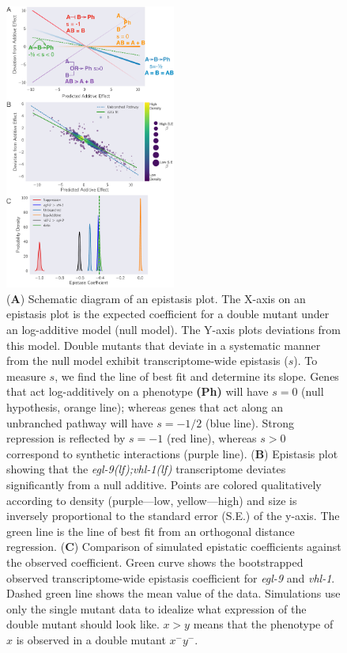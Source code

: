\documentclass[9pt,twocolumn,twoside]{pnas-new}
\newcommand{\gene}[1]{\mbox{\emph{#1}}}
\newcommand{\eglvhl}{\gene{egl-9(lf);vhl-1(lf)}}
\begin{document}
\begin{figure}[tbhp]
  \centering
  \includegraphics[width=0.5\textwidth]{../figs/egl9vhl1-epistasis.pdf}
  \caption{
    (\textbf{A}) Schematic diagram of an epistasis plot. The X-axis on an
    epistasis plot is the expected coefficient for a double mutant under an
    log-additive model (null model). The Y-axis plots deviations from this
    model. Double mutants that deviate in a systematic manner from the null
    model exhibit transcriptome-wide epistasis ($s$). To measure $s$, we find
    the line of best fit and determine its slope. Genes that act log-additively
    on a phenotype \textbf{(Ph)} will have $s=0$ (null hypothesis, orange line);
    whereas genes that act along an unbranched pathway will have $s=-1/2$ (blue
    line). Strong repression is reflected by $s=-1$ (red line), whereas $s>0$
    correspond to synthetic interactions (purple line). (\textbf{B}) Epistasis
    plot showing that the \eglvhl{} transcriptome deviates significantly from a
    null additive. Points are colored qualitatively according to density
    (purple---low, yellow---high) and size is inversely proportional to the
    standard error (S.E.) of the y-axis. The green line is the line of best fit
    from an orthogonal distance regression. (\textbf{C}) Comparison of simulated
    epistatic coefficients against the observed coefficient. Green curve shows
    the bootstrapped observed transcriptome-wide epistasis coefficient for
    \gene{egl-9} and \gene{vhl-1}. Dashed green line shows the mean value of the
    data. Simulations use only the single mutant data to idealize what
    expression of the double mutant should look like. $x > y$ means that the
    phenotype of $x$ is observed in a double mutant $x^-y^-$. }
\label{fig:egl9epistasis}
\end{figure}
\end{document}
